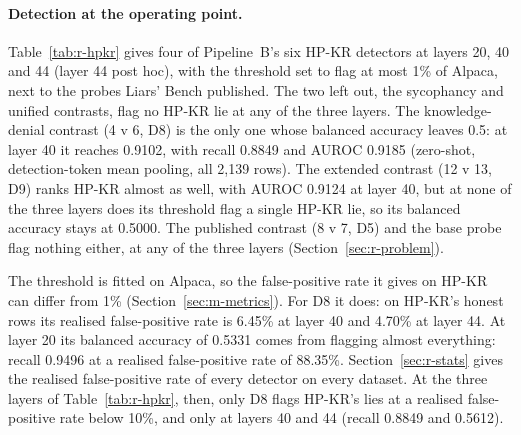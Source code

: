 \paragraph{Detection at the operating point.}
Table~\ref{tab:r-hpkr} gives four of Pipeline~B's six HP-KR detectors at layers 20, 40 and 44 (layer 44 post hoc), with the threshold set to flag at most 1\% of Alpaca, next to the probes Liars' Bench published. %
The two left out, the sycophancy and unified contrasts, flag no HP-KR lie at any of the three layers. %
The knowledge-denial contrast (4 v 6, D8) is the only one whose balanced accuracy leaves 0.5: at layer 40 it reaches 0.9102, with recall 0.8849 and AUROC 0.9185 (zero-shot, detection-token mean pooling, all 2{,}139 rows). %
The extended contrast (12 v 13, D9) ranks HP-KR almost as well, with AUROC 0.9124 at layer 40, but at none of the three layers does its threshold flag a single HP-KR lie, so its balanced accuracy stays at 0.5000. %
The published contrast (8 v 7, D5) and the base probe flag nothing either, at any of the three layers (Section~\ref{sec:r-problem}). %

The threshold is fitted on Alpaca, so the false-positive rate it gives on HP-KR can differ from 1\% (Section~\ref{sec:m-metrics}).
For D8 it does: on HP-KR's honest rows its realised false-positive rate is 6.45\% at layer 40 and 4.70\% at layer 44. %
At layer 20 its balanced accuracy of 0.5331 comes from flagging almost everything: recall 0.9496 at a realised false-positive rate of 88.35\%. %
Section~\ref{sec:r-stats} gives the realised false-positive rate of every detector on every dataset.
At the three layers of Table~\ref{tab:r-hpkr}, then, only D8 flags HP-KR's lies at a realised false-positive rate below 10\%, and only at layers 40 and 44 (recall 0.8849 and 0.5612). %


